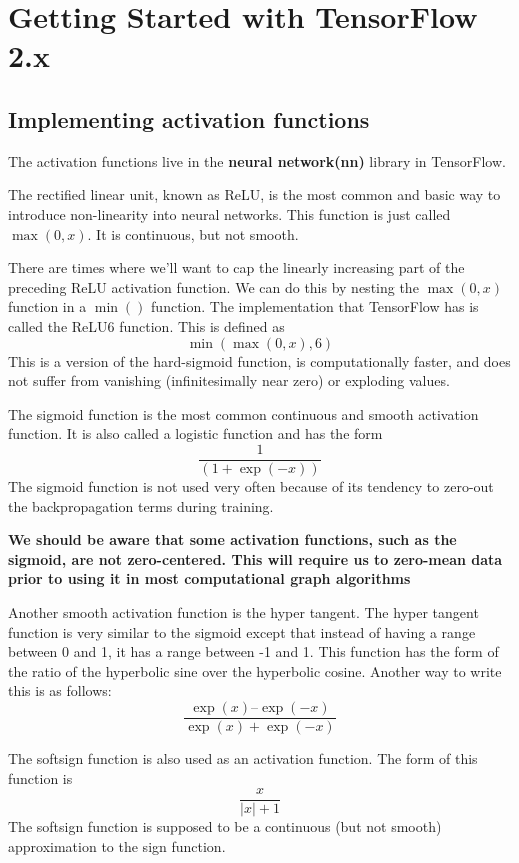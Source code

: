 \chapter{Getting Started with TensorFlow 2.x\label{ch01}}
\section{Implementing activation functions}

The activation functions live in the \textbf{neural network(nn)} library in TensorFlow.

The rectified linear unit, known as ReLU, is the most common and basic way to introduce non-linearity into neural networks. This function is just called $\max(0,x)$. It is continuous, but not smooth.

There are times where we'll want to cap the linearly increasing part of the preceding ReLU activation function. We can do this by nesting the $\max(0,x)$ function in a $\min()$ function. The implementation that TensorFlow has is called the ReLU6 function. This is defined as $$\min(\max(0,x),6)$$ This is a version of the hard-sigmoid function, is computationally faster, and does not suffer from vanishing (infinitesimally near zero) or exploding values.

The sigmoid function is the most common continuous and smooth activation function. It is also called a logistic function and has the form $$\frac{1}{(1 + \exp(-x))}$$ The sigmoid function is not used very often because of its tendency to zero-out the backpropagation terms during training.

\textbf{
    We should be aware that some activation functions, such as the sigmoid, are not zero-centered. This will require us to zero-mean data prior to using it in most computational graph algorithms
}

Another smooth activation function is the hyper tangent. The hyper tangent function is very similar to the sigmoid except that instead of having a range between 0 and 1, it has a range between -1 and 1. This function has the form of the ratio of the hyperbolic sine over the hyperbolic cosine. Another way to write this is as follows:
\begin{equation}
    \frac{\exp(x) – \exp(-x)}{\exp(x) + \exp(-x)}
\end{equation}

The softsign function is also used as an activation function. The form of this function is
\begin{equation}
    \frac{x}{|x|+1}
\end{equation}
The softsign function is supposed to be a continuous (but not smooth) approximation to the sign function.

